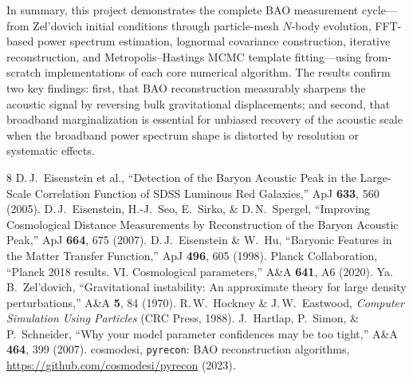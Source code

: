 \documentclass[10pt]{article}
\begin{document}
In summary, this project demonstrates the complete BAO measurement cycle---from Zel'dovich initial conditions through particle-mesh $N$-body evolution, FFT-based power spectrum estimation, lognormal covariance construction, iterative reconstruction, and Metropolis--Hastings MCMC template fitting---using from-scratch implementations of each core numerical algorithm.  The results confirm two key findings: first, that BAO reconstruction measurably sharpens the acoustic signal by reversing bulk gravitational displacements; and second, that broadband marginalization is essential for unbiased recovery of the acoustic scale when the broadband power spectrum shape is distorted by resolution or systematic effects.

\small
\begin{thebibliography}{8}
 D.\,J.~Eisenstein et al., ``Detection of the Baryon Acoustic Peak in the Large-Scale Correlation Function of SDSS Luminous Red Galaxies,'' ApJ \textbf{633}, 560 (2005).
 D.\,J.~Eisenstein, H.-J.~Seo, E.~Sirko, \& D.\,N.~Spergel, ``Improving Cosmological Distance Measurements by Reconstruction of the Baryon Acoustic Peak,'' ApJ \textbf{664}, 675 (2007).
 D.\,J.~Eisenstein \& W.~Hu, ``Baryonic Features in the Matter Transfer Function,'' ApJ \textbf{496}, 605 (1998).
 Planck Collaboration, ``Planck 2018 results. VI. Cosmological parameters,'' A\&A \textbf{641}, A6 (2020).
 Ya.\,B.~Zel'dovich, ``Gravitational instability: An approximate theory for large density perturbations,'' A\&A \textbf{5}, 84 (1970).
 R.\,W.~Hockney \& J.\,W.~Eastwood, \emph{Computer Simulation Using Particles} (CRC Press, 1988).
 J.~Hartlap, P.~Simon, \& P.~Schneider, ``Why your model parameter confidences may be too tight,'' A\&A \textbf{464}, 399 (2007).
 cosmodesi, \texttt{pyrecon}: BAO reconstruction algorithms, \url{https://github.com/cosmodesi/pyrecon} (2023).
\end{thebibliography}
\end{document}
